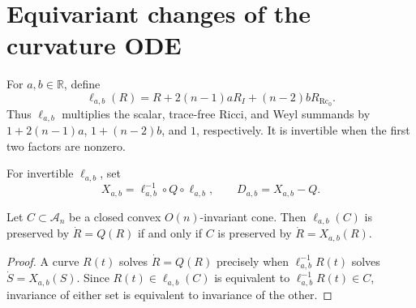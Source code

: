 \section{Equivariant changes of the curvature ODE}

\begin{definition}
  \label{def:chow-ii-ell-transformations}
  For \(a,b\in\mathbb R\), define
  \[
   \ell_{a,b}(R)=R+2(n-1)aR_I+(n-2)bR_{\operatorname{Rc}_0}.
  \]
  Thus \(\ell_{a,b}\) multiplies the scalar, trace-free Ricci, and Weyl
  summands by \(1+2(n-1)a\), \(1+(n-2)b\), and \(1\), respectively.  It is
  invertible when the first two factors are nonzero.
\end{definition}

\begin{definition}
  \label{def:chow-ii-conjugated-curvature-quadratic}
  For invertible \(\ell_{a,b}\), set
  \[
  X_{a,b}=\ell_{a,b}^{-1}\circ Q\circ\ell_{a,b},
  \qquad D_{a,b}=X_{a,b}-Q.
  \]
\end{definition}

\begin{lemma}
  \label{lem:chow-ii-linear-image-ode-cone-criterion}
  Let \(C\subset\mathcal A_n\) be a closed convex \(O(n)\)-invariant cone.
  Then \(\ell_{a,b}(C)\) is preserved by \(\dot R=Q(R)\) if and only if
  \(C\) is preserved by \(\dot R=X_{a,b}(R)\).
\end{lemma}
\begin{proof}
  A curve \(R(t)\) solves \(\dot R=Q(R)\) precisely when
  \(\ell_{a,b}^{-1}R(t)\) solves \(\dot S=X_{a,b}(S)\).  Since
  \(R(t)\in\ell_{a,b}(C)\) is equivalent to
  \(\ell_{a,b}^{-1}R(t)\in C\), invariance of either set is equivalent to
  invariance of the other.
\end{proof}

